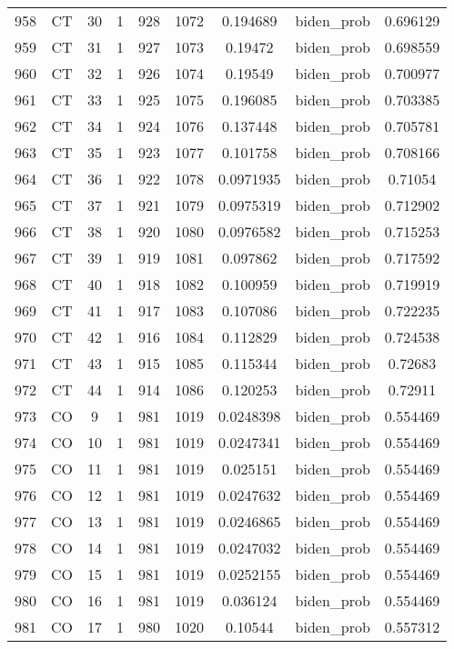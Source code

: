 \documentclass[12pt,a4paper]{article}
\begin{document}
\begin{tabular}{r|cccccccc}
	958 & CT & 30 & 1 & 928 & 1072 & 0.194689 & biden\_prob & 0.696129 \\
	959 & CT & 31 & 1 & 927 & 1073 & 0.19472 & biden\_prob & 0.698559 \\
	960 & CT & 32 & 1 & 926 & 1074 & 0.19549 & biden\_prob & 0.700977 \\
	961 & CT & 33 & 1 & 925 & 1075 & 0.196085 & biden\_prob & 0.703385 \\
	962 & CT & 34 & 1 & 924 & 1076 & 0.137448 & biden\_prob & 0.705781 \\
	963 & CT & 35 & 1 & 923 & 1077 & 0.101758 & biden\_prob & 0.708166 \\
	964 & CT & 36 & 1 & 922 & 1078 & 0.0971935 & biden\_prob & 0.71054 \\
	965 & CT & 37 & 1 & 921 & 1079 & 0.0975319 & biden\_prob & 0.712902 \\
	966 & CT & 38 & 1 & 920 & 1080 & 0.0976582 & biden\_prob & 0.715253 \\
	967 & CT & 39 & 1 & 919 & 1081 & 0.097862 & biden\_prob & 0.717592 \\
	968 & CT & 40 & 1 & 918 & 1082 & 0.100959 & biden\_prob & 0.719919 \\
	969 & CT & 41 & 1 & 917 & 1083 & 0.107086 & biden\_prob & 0.722235 \\
	970 & CT & 42 & 1 & 916 & 1084 & 0.112829 & biden\_prob & 0.724538 \\
	971 & CT & 43 & 1 & 915 & 1085 & 0.115344 & biden\_prob & 0.72683 \\
	972 & CT & 44 & 1 & 914 & 1086 & 0.120253 & biden\_prob & 0.72911 \\
	973 & CO & 9 & 1 & 981 & 1019 & 0.0248398 & biden\_prob & 0.554469 \\
	974 & CO & 10 & 1 & 981 & 1019 & 0.0247341 & biden\_prob & 0.554469 \\
	975 & CO & 11 & 1 & 981 & 1019 & 0.025151 & biden\_prob & 0.554469 \\
	976 & CO & 12 & 1 & 981 & 1019 & 0.0247632 & biden\_prob & 0.554469 \\
	977 & CO & 13 & 1 & 981 & 1019 & 0.0246865 & biden\_prob & 0.554469 \\
	978 & CO & 14 & 1 & 981 & 1019 & 0.0247032 & biden\_prob & 0.554469 \\
	979 & CO & 15 & 1 & 981 & 1019 & 0.0252155 & biden\_prob & 0.554469 \\
	980 & CO & 16 & 1 & 981 & 1019 & 0.036124 & biden\_prob & 0.554469 \\
	981 & CO & 17 & 1 & 980 & 1020 & 0.10544 & biden\_prob & 0.557312 \\

\end{tabular}
\end{document}
